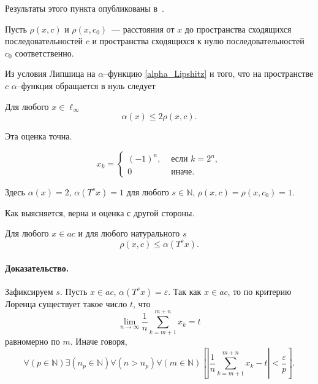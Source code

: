 Результаты этого пункта опубликованы в~\cite{our-mz2019ac0}.

Пусть $\rho(x,c)$ и $\rho(x,c_0)$~--- расстояния от $x$ до пространства сходящихся последовательностей $c$
и пространства сходящихся к нулю последовательностей $c_0$ соответственно.

Из условия Липшица на $\alpha$--функцию \eqref{alpha_Lipshitz}
и того, что на пространстве $c$
$\alpha$--функция обращается в нуль следует

\begin{lemma}
\label{thm:alpha_x_leq_2_rho_x_c}
	Для любого $x\in\ell_\infty$
	\begin{equation}
		\alpha(x) \leq 2\rho(x, c)
		.
	\end{equation}
\end{lemma}


Эта оценка точна.
\begin{example}
\label{ex:alpha_ac_rho_x_c}
	\begin{equation}
	\label{eq:alpha_ac_distance_example_y}
		x_k = \begin{cases}
			(-1)^n, &\mbox{~если~} k = 2^n,
			\\
			0 &\mbox{~иначе.}
		\end{cases}
	\end{equation}
\end{example}
Здесь $\alpha(x) = 2$, $\alpha(T^s x) = 1$ для любого $s\in\mathbb{N}$, $\rho(x,c) = \rho(x, c_0) = 1$.

Как выясняется, верна и оценка с другой стороны.

\begin{lemma}
\label{thm:rho_x_c_leq_alpha_t_s_x}
	Для любого $x\in ac$ и для любого натурального $s$
	\begin{equation}
		\rho(x,c)\leq \alpha(T^s x)
		.
	\end{equation}
\end{lemma}
\paragraph{Доказательство.}
Зафиксируем $s$.
Пусть $x\in ac$, $\alpha(T^s x)=\varepsilon$.
Так как $x\in ac$, то по критерию Лоренца существует такое число $t$,
что
\begin{equation}
	\lim_{n\to\infty} \frac{1}{n} \sum_{k=m+1}^{m+n} x_k = t
\end{equation}
равномерно по $m$.
Иначе говоря,
\begin{equation}
	\forall(p\in\mathbb{N})
	\exists(n_p \in\mathbb{N})\forall(n>n_p)\forall(m\in\mathbb{N})
	\left[
		\left|
			\frac{1}{n}\sum_{k=m+1}^{m+n} x_k
			-t
		\right|
		<\frac{\varepsilon}{p}
	\right]
	.
\end{equation}

